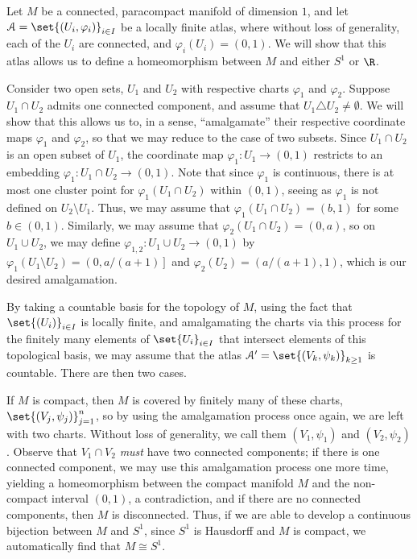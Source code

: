 \documentclass[10pt]{mypackage}
\begin{document}
\begin{solution}
  Let $M$ be a connected, paracompact manifold of dimension $1$, and let $\mathcal{A} = \set{\left( U_i,\varphi_i \right)}_{i\in I}$ be a locally finite atlas, where without loss of generality, each of the $U_i$ are connected, and $\varphi_i\left( U_i \right) = (0,1)$. We will show that this atlas allows us to define a homeomorphism between $M$ and either $S^{1}$ or $\R$.\newline

  Consider two open sets, $U_1$ and $U_2$ with respective charts $\varphi_1$ and $\varphi_2$. Suppose $U_1\cap U_2$ admits one connected component, and assume that $U_1\triangle U_2\neq \emptyset$. We will show that this allows us to, in a sense, ``amalgamate'' their respective coordinate maps $\varphi_1$ and $\varphi_2$, so that we may reduce to the case of two subsets. Since $U_1\cap U_2$ is an open subset of $U_1$, the coordinate map $\varphi_1\colon U_1\rightarrow (0,1)$ restricts to an embedding $\varphi_1\colon U_1\cap U_2\rightarrow (0,1)$. Note that since $\varphi_{1}$ is continuous, there is at most one cluster point for $\varphi_1\left( U_1\cap U_2 \right)$ within $(0,1)$, seeing as $\varphi_1$ is not defined on $U_2\setminus U_1$. Thus, we may assume that $\varphi_{1}\left( U_1\cap U_2 \right) = (b,1)$ for some $b\in (0,1)$. Similarly, we may assume that $\varphi_2\left( U_1\cap U_2 \right) = (0,a)$, so on $U_1\cup U_2$, we may define $\varphi_{1,2}\colon U_1\cup U_2\rightarrow (0,1)$ by $\varphi_{1}\left( U_1\setminus U_2 \right) = \left(0,a/(a+1)\right]$ and $\varphi_{2}\left( U_2 \right) = \left(a/(a+1),1\right)$, which is our desired amalgamation.\newline

  By taking a countable basis for the topology of $M$, using the fact that $\set{\left( U_i \right)}_{i\in I}$ is locally finite, and amalgamating the charts via this process for the finitely many elements of $\set{U_i}_{i\in I}$ that intersect elements of this topological basis, we may assume that the atlas $\mathcal{A}' = \set{\left( V_k,\psi_k \right)}_{k\geq 1}$ is countable. There are then two cases.\newline

  If $M$ is compact, then $M$ is covered by finitely many of these charts, $\set{\left( V_j,\psi_j \right)}_{j=1}^{n}$, so by using the amalgamation process once again, we are left with two charts. Without loss of generality, we call them $\left( V_1,\psi_1 \right)$ and $\left( V_2,\psi_2 \right)$. Observe that $V_1\cap V_2$  \textit{must} have two connected components; if there is one connected component, we may use this amalgamation process one more time, yielding a homeomorphism between the compact manifold $M$ and the non-compact interval $\left( 0,1 \right)$, a contradiction, and if there are no connected components, then $M$ is disconnected. Thus, if we are able to develop a continuous bijection between $M$ and $S^{1}$, since $S^{1}$ is Hausdorff and $M$ is compact, we automatically find that $M \cong S^{1}$.\newline


\end{solution}
\end{document}
